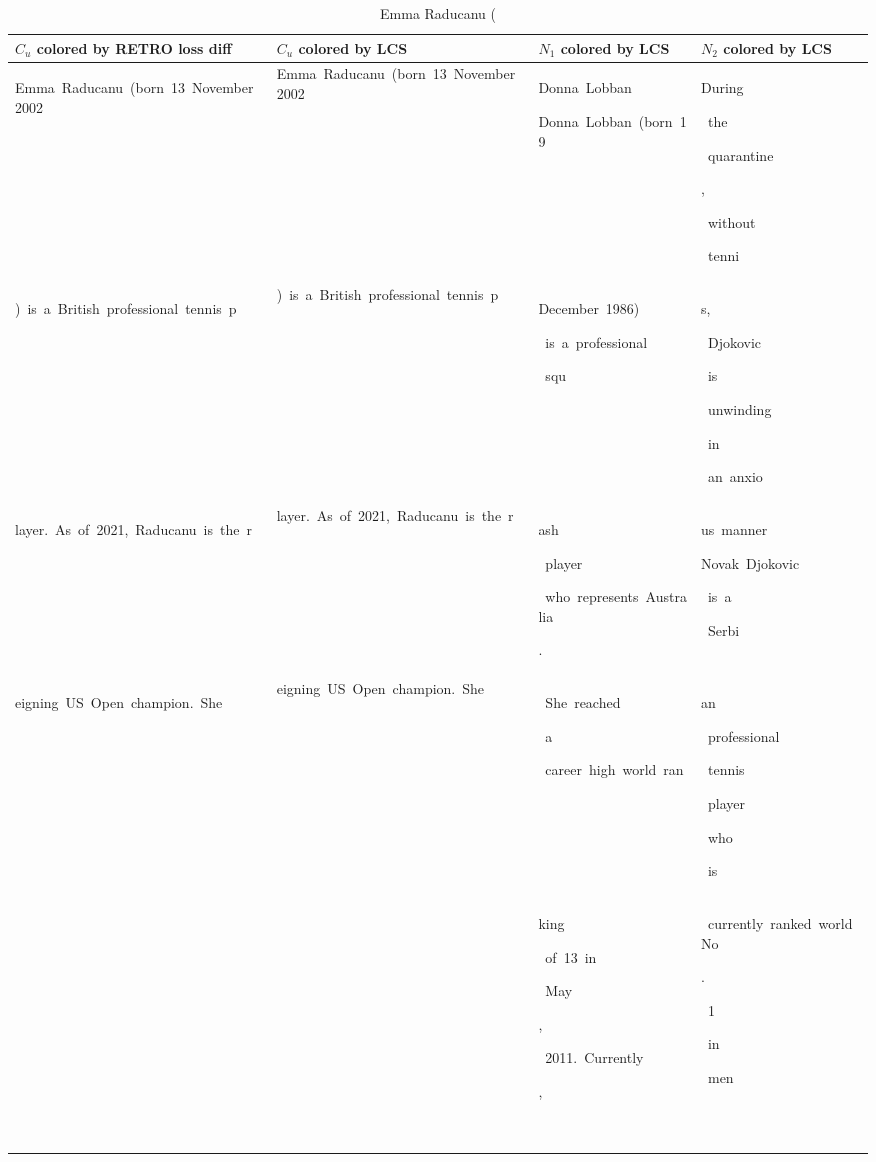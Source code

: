    \begin{table}[h]       \tiny       \caption{Emma Raducanu (       }       \vspace{2.0mm}       \centering       \begin{tabular}{ l | l | l | l }$C_u$ colored by RETRO loss diff & $C_u$ colored by LCS & $N_1$ colored by LCS & $N_2$ colored by LCS \\ \hline\colorbox{cm_32!40}{\strut Emma\ Raducanu\ (born\ 13\ November\ 2002} & Emma\ Raducanu\ (born\ 13\ November\ 2002 & \colorbox{cm_0!40}{\strut Donna\ Lobban}\colorbox{cm_12!40}{\strut }\colorbox{cm_25!40}{\strut }\colorbox{cm_0!40}{\strut Donna\ Lobban\ (born\ 19\ } & \colorbox{cm_0!40}{\strut During}\colorbox{cm_12!40}{\strut \ the}\colorbox{cm_0!40}{\strut \ quarantine}\colorbox{cm_12!40}{\strut ,}\colorbox{cm_0!40}{\strut \ without}\colorbox{cm_12!40}{\strut \ tenni} \\ 
 \colorbox{cm_32!40}{\strut )\ is\ a\ British\ professional\ tennis\ p} & )\ is\ a\ British\ professional\ tennis\ p & \colorbox{cm_0!40}{\strut December\ 1986)}\colorbox{cm_12!40}{\strut \ is\ a\ professional}\colorbox{cm_0!40}{\strut \ squ} & \colorbox{cm_12!40}{\strut s,}\colorbox{cm_0!40}{\strut \ Djokovic}\colorbox{cm_12!40}{\strut \ is}\colorbox{cm_0!40}{\strut \ unwinding}\colorbox{cm_12!40}{\strut \ in}\colorbox{cm_0!40}{\strut \ an\ anxio} \\ 
 \colorbox{cm_32!40}{\strut layer.\ As\ of\ 2021,\ Raducanu\ is\ the\ r} & layer.\ As\ of\ 2021,\ Raducanu\ is\ the\ r & \colorbox{cm_0!40}{\strut ash}\colorbox{cm_12!40}{\strut \ player}\colorbox{cm_0!40}{\strut \ who\ represents\ Australia}\colorbox{cm_12!40}{\strut .} & \colorbox{cm_0!40}{\strut us\ manner}\colorbox{cm_12!40}{\strut }\colorbox{cm_25!40}{\strut }\colorbox{cm_0!40}{\strut Novak\ Djokovic}\colorbox{cm_12!40}{\strut \ is\ a}\colorbox{cm_0!40}{\strut \ Serbi} \\ 
 \colorbox{cm_32!40}{\strut eigning\ US\ Open\ champion.\ She} & eigning\ US\ Open\ champion.\ She & \colorbox{cm_0!40}{\strut \ She\ reached}\colorbox{cm_12!40}{\strut \ a}\colorbox{cm_0!40}{\strut \ career\ high\ world\ ran} & \colorbox{cm_0!40}{\strut an}\colorbox{cm_12!40}{\strut \ professional}\colorbox{cm_25!40}{\strut \ tennis}\colorbox{cm_38!40}{\strut \ player}\colorbox{cm_0!40}{\strut \ who}\colorbox{cm_12!40}{\strut \ is} \\ 
  &  & \colorbox{cm_0!40}{\strut king}\colorbox{cm_12!40}{\strut \ of\ 13\ in}\colorbox{cm_0!40}{\strut \ May}\colorbox{cm_12!40}{\strut ,}\colorbox{cm_0!40}{\strut \ 2011.\ Currently}\colorbox{cm_12!40}{\strut ,}\colorbox{cm_0!40}{\strut \ } & \colorbox{cm_0!40}{\strut \ currently\ ranked\ world\ No}\colorbox{cm_12!40}{\strut .}\colorbox{cm_0!40}{\strut \ 1}\colorbox{cm_12!40}{\strut \ in}\colorbox{cm_0!40}{\strut \ men} \\ 

\end{tabular}
\end{table}
